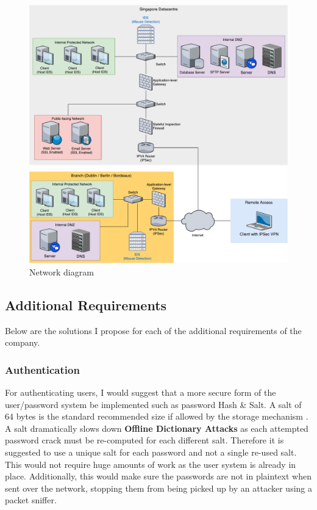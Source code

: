 \documentclass[11pt]{article}
\begin{document}
          \begin{figure}[h]
            \centering
            \includegraphics[width=13cm]{network-diagram.pdf}
            \caption{Network diagram}
            \label{fig:network-diagram}
          \end{figure}

      \subsection{Additional Requirements}
        Below are the solutions I propose for each of the additional requirements of the company.

        \subsubsection{Authentication} \label{auth}
          For authenticating users, I would suggest that a more secure form of the user/password system be implemented such as password Hash \& Salt. A salt of 64 bytes is the standard recommended size if allowed by the storage mechanism \citep{owaspSalt}. A salt dramatically slows down \textbf{Offline Dictionary Attacks} as each attempted password crack must be re-computed for each different salt. Therefore it is suggested to use a unique salt for each password and not a single re-used salt. This would not require huge amounts of work as the user system is already in place. Additionally, this would make sure the passwords are not in plaintext when sent over the network, stopping them from being picked up by an attacker using a packet sniffer.
\end{document}
